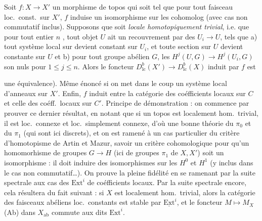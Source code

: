 \documentclass[11pt,a4paper]{article}
\begin{document}
Soit $f : X \to X'$ un morphisme de topos qui soit tel que pour tout faisceau
loc.\ const.\ sur $X'$, $f$ induise un isomorphisme sur les cohomolog
(avec cas non commutatif inclus). Supposons que \struck{\ill{}}  soit \emph{locale homotopiquement trivial}, i.e. que pour tout
entier $n$ , tout objet $U$  ait un
recouvrement par des $U_{i} \to U$, tels que a) tout système local sur
 devient constant sur $U_{i}$, et toute section sur $U$ devient
constante sur $U$ et b) pour tout groupe abélien $G$, les
$H^{j}(U, G) \to H^{j}(U_{i}, G)$ son nuls pour $1 \leq j \leq n$. Alors
le foncteur $D^{b}_{\mathrm{lc}}(X') \to D^{b}_{\mathrm{lc}}(X)$ induit par
$f$ est


une équivalence). Même énoncé si on met dans le coup un système local
d'anneaux sur $X'$. Enfin, $f$ induit  entre la
catégorie des coéfficients locaux sur $C$ et celle des coéff.\ locaux sur
$C'$.
Principe de démonstration : on commence par prouver ce dernier résultat, en
notant que si un topos est localement hom.\ trivial, il est loc.\ connexe et
loc.\ simplement connexe, d'où une bonne théorie du $\pi_{0}$ et du $\pi_{1}$
(qui sont ici discrets), et on est ramené à un cas particulier du critère
d'homotopisme de Artin et Mazur, savoir un critère cohomologique pour qu'un
homomorhisme de groupes $G \to H$ (ici de groupes $\pi_{1}$ de
$X, X'$) soit un isomorphisme : il doit induire des isomorphismes sur les
$H^{0}$ et $H^{1}$ (y inclus dans le cas non commutatif…). On prouve la
pleine fidélité en se ramenant par la suite spectrale aux cas des
$\mathrm{Ext}^{i}$ de coéfficients locaux. Par la suite spectrale encore, cela
résultera du fait suivant : si $X$ est localement hom.\ trivial, alors la
catégorie des faisceaux abéliens loc.\ constants est stable par
$\underline{\mathrm{Ext}}^{i}$, et le foncteur $M \mapsto M_{X}$ (Ab) dans
$X_{\mathrm{ab}}$ commute aux dits $\mathrm{Ext}^{i}$.
\end{document}
